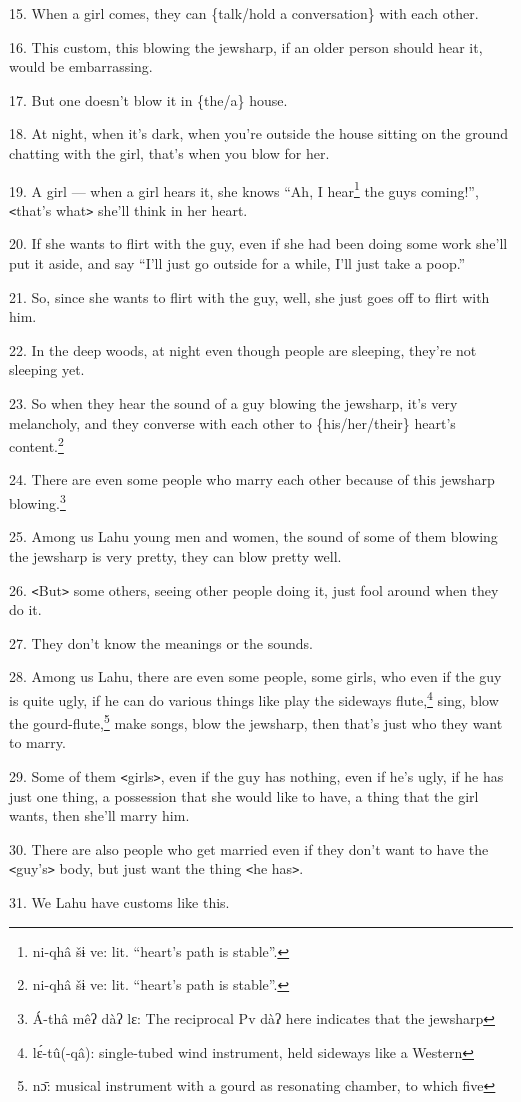 15. When a girl comes, they can \{talk/hold a conversation\} with each other.

16. This custom, this blowing the jewsharp, if an older person should hear it,
would be embarrassing.

17. But one doesn't blow it in \{the/a\} house.

18. At night, when it's dark, when you're outside the house sitting on the ground
chatting with the girl, that's when you blow for her.

19. A girl --- when a girl hears it, she knows ``Ah, I hear\footnote{ni-qhâ šɨ ve: lit. ``heart's path is stable''.} the guys coming!'',
\texttt{<}that's what\texttt{>} she'll think in her heart.

20. If she wants to flirt with the guy, even if she had been doing some work she'll
put it aside, and say ``I'll just go outside for a while, I'll just take a poop.''

21. So, since she wants to flirt with the guy, well, she just goes off to flirt
with him.

22. In the deep woods, at night even though people are sleeping, they're not sleeping
yet.

23. So when they hear the sound of a guy blowing the jewsharp, it's very melancholy,
and they converse with each other to \{his/her/their\} heart's content.\footnote{ni-qhâ šɨ ve: lit. ``heart's path is stable''.}

24. There are even some people who marry each other because of this jewsharp blowing.\footnote{Á-thâ mêʔ dàʔ lɛ: The reciprocal Pv dàʔ here indicates that the jewsharp}

25. Among us Lahu young men and women, the sound of some of them blowing the jewsharp
is very pretty, they can blow pretty well.

26. \texttt{<}But\texttt{>} some others, seeing other people doing it, just fool
around when they do it.

27. They don't know the meanings or the sounds.

28. Among us Lahu, there are even some people, some girls, who even if the guy
is quite ugly, if he can do various things like play the sideways flute,\footnote{lɛ́-tû(-qâ): single-tubed wind instrument, held sideways like a Western} sing,
blow the gourd-flute,\footnote{nɔ̄: musical instrument with a gourd as resonating chamber, to which five} make songs, blow the jewsharp, then that's just who they
want to marry.

29. Some of them \texttt{<}girls\texttt{>}, even if the guy has nothing, even if
he's ugly, if he has just one thing, a possession that she would like to have,
a thing that the girl wants, then she'll marry him.

30. There are also people who get married even if they don't want to have the \texttt{<}guy's\texttt{>}
body, but just want the thing \texttt{<}he has\texttt{>}.

31. We Lahu have customs like this.

